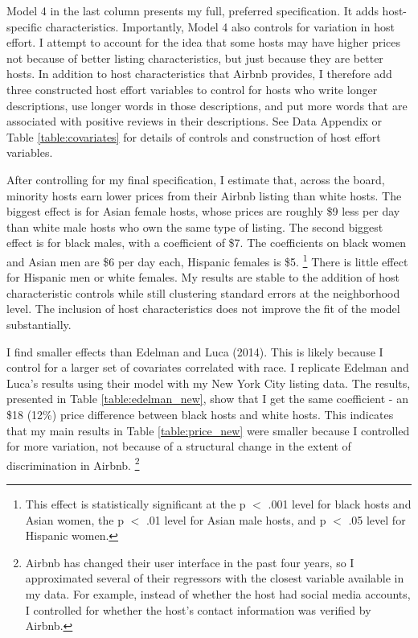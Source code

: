 
Model 4 in the last column presents my full, preferred specification. It adds host-specific characteristics. Importantly, Model 4 also controls for variation in host effort. I attempt to account for the idea that some hosts may have higher prices not because of better listing characteristics, but just because they are better hosts. In addition to host characteristics that Airbnb provides, I therefore add three constructed host effort variables to control for hosts who write longer descriptions, use longer words in those descriptions, and put more words that are associated with positive reviews in their descriptions. See Data Appendix or Table \ref{table:covariates} for details of controls and construction of host effort variables. 

After controlling for my final specification, I estimate that, across the board, minority hosts earn lower prices from their Airbnb listing than white hosts. The biggest effect is for Asian female hosts, whose prices are roughly \$9 less per day than white male hosts who own the same type of listing. The second biggest effect is for black males, with a coefficient of \$7. The coefficients on black women and Asian men are \$6 per day each, Hispanic females is \$5.%
	\footnote{This effect is statistically significant at the p $<$ .001 level for black hosts and Asian women, the p $<$ .01 level for Asian male hosts, and p $<$ .05 level for Hispanic women.}  
There is little effect for Hispanic men or white females. My results are stable to the addition of host characteristic controls while still clustering standard errors at the neighborhood level. The inclusion of host characteristics does not improve the fit of the model substantially.  

I find smaller effects than Edelman and Luca (2014). This is likely because I control for a larger set of covariates correlated with race. I replicate Edelman and Luca's results using their model with my New York City listing data. The results, presented in Table \ref{table:edelman_new}, show that I get the same coefficient - an \$18 (12\%) price difference between black hosts and white hosts. This indicates that my main results in Table \ref{table:price_new} were smaller because I controlled for more variation, not because of a structural change in the extent of discrimination in Airbnb.%
	\footnote{Airbnb has changed their user interface in the past four years, so I approximated several of their regressors with the closest variable available in my data. For example, instead of whether the host had social media accounts, I controlled for whether the host's contact information was verified by Airbnb.}



